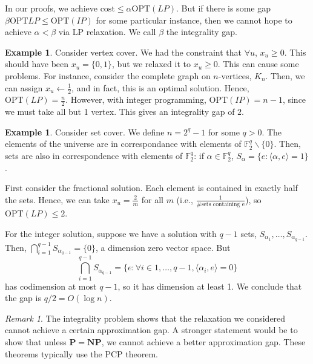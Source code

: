 \documentclass[11pt]{article}
\theoremstyle{definition}
\newtheorem{example}[theorem]{Example}
\theoremstyle{remark}
\newtheorem{remark}[theorem]{Remark}
\begin{document}
In our proofs, we achieve $\mathrm{cost} \leq \alpha \mathrm{OPT}(LP)$.
But if there is some gap $\beta \mathrm{OPT}{LP} \leq \mathrm{OPT}(IP)$
for some particular instance, then
we cannot hope to achieve $\alpha < \beta$ via LP relaxation.
We call $\beta$ the integrality gap.
\begin{example}
    Consider vertex cover.
    We had the constraint that $\forall u$, $x_u \geq 0$.
    This should have been $x_u = \{0, 1\}$,
    but we relaxed it to $x_u \geq 0$.
    This can cause some problems.
    For instance, consider the complete graph on $n$-vertices, $K_n$.
    Then, we can assign $x_u \leftarrow \frac{1}{2}$,
    and in fact, this is an optimal solution.
    Hence, $\mathrm{OPT}(LP)=\frac{n}{2}$.
    However, with integer programming, $\mathrm{OPT}(IP) = n-1$,
    since we must take all but 1 vertex.
    This gives an integrality gap of $2$.
\end{example}
\begin{example}
    Consider set cover.
    We define $n = 2^q-1$ for some $q > 0$.
    The elements of the universe are in correspondance with elements of $\mathbb{F}_2^q \backslash \{0\}$.
    Then, sets are also in correspondence with elements
    of $\mathbb{F}_2^q$: if $\alpha \in \mathbb{F}_2^q$,
    $S_\alpha = \{e: \langle \alpha, e\rangle = 1\}$.

    First consider the fractional solution.
    Each element is contained in exactly half the sets.
    Hence, we can take $x_u = \frac{2}{m}$ for all $m$ (i.e., $\frac{1}{\text{\# sets containing e}}$),
    so $\mathrm{OPT}(LP) \leq 2$.

    For the integer solution, suppose we have a solution with $q-1$ sets,
    $S_{\alpha_1}, \ldots, S_{\alpha_{q-1}}$.
    Then, $\bigcap_{i=1}^{q-1} S_{\alpha_{q-1}}= \{0\}$, a dimension zero vector space.
    But
    \[
        \bigcap_{i=1}^{q-1} S_{\alpha_{q-1}}= \{e: \forall i \in 1, \ldots, q-1, \langle \alpha_i, e \rangle = 0\}
    \]
    has codimension at most $q-1$, so it has dimension at least 1.
    We conclude that the gap is $q/2 = O(\log n)$.
\end{example}
\begin{remark}
    The integrality problem shows that the relaxation we considered cannot achieve a certain approximation gap.
    A stronger statement would be to show that unless $\mathbf{P}=\mathbf{NP}$,
    we cannot achieve a better approximation gap.
    These theorems typically use the PCP theorem.
\end{remark}
\end{document}

